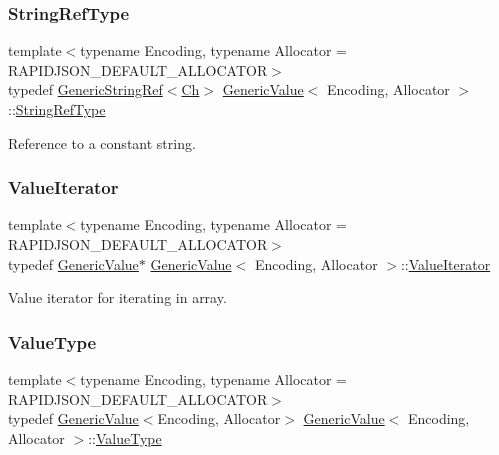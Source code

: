 \mbox{\label{classGenericValue_a32e0f30ee278072374c8168b14d3317f}} 
\subsubsection{\texorpdfstring{String\+Ref\+Type}{StringRefType}}
{\footnotesize\ttfamily template$<$typename Encoding, typename Allocator = R\+A\+P\+I\+D\+J\+S\+O\+N\+\_\+\+D\+E\+F\+A\+U\+L\+T\+\_\+\+A\+L\+L\+O\+C\+A\+T\+OR$>$ \\
typedef \hyperlink{structGenericStringRef}{Generic\+String\+Ref}$<$\hyperlink{classGenericValue_ade0e0ce64ccd5d852da57a35e720bafb}{Ch}$>$ \hyperlink{classGenericValue}{Generic\+Value}$<$ Encoding, Allocator $>$\+::\hyperlink{classGenericValue_a32e0f30ee278072374c8168b14d3317f}{String\+Ref\+Type}}



Reference to a constant string. 

\mbox{\label{classGenericValue_aee30721a49688ba0f865f5d581eb6be9}} 
\subsubsection{\texorpdfstring{Value\+Iterator}{ValueIterator}}
{\footnotesize\ttfamily template$<$typename Encoding, typename Allocator = R\+A\+P\+I\+D\+J\+S\+O\+N\+\_\+\+D\+E\+F\+A\+U\+L\+T\+\_\+\+A\+L\+L\+O\+C\+A\+T\+OR$>$ \\
typedef \hyperlink{classGenericValue}{Generic\+Value}$\ast$ \hyperlink{classGenericValue}{Generic\+Value}$<$ Encoding, Allocator $>$\+::\hyperlink{classGenericValue_aee30721a49688ba0f865f5d581eb6be9}{Value\+Iterator}}



Value iterator for iterating in array. 

\mbox{\label{classGenericValue_a43a39bb4fca9b9d3de3da6ac353d25ce}} 
\subsubsection{\texorpdfstring{Value\+Type}{ValueType}}
{\footnotesize\ttfamily template$<$typename Encoding, typename Allocator = R\+A\+P\+I\+D\+J\+S\+O\+N\+\_\+\+D\+E\+F\+A\+U\+L\+T\+\_\+\+A\+L\+L\+O\+C\+A\+T\+OR$>$ \\
typedef \hyperlink{classGenericValue}{Generic\+Value}$<$Encoding, Allocator$>$ \hyperlink{classGenericValue}{Generic\+Value}$<$ Encoding, Allocator $>$\+::\hyperlink{classGenericValue_a43a39bb4fca9b9d3de3da6ac353d25ce}{Value\+Type}}



